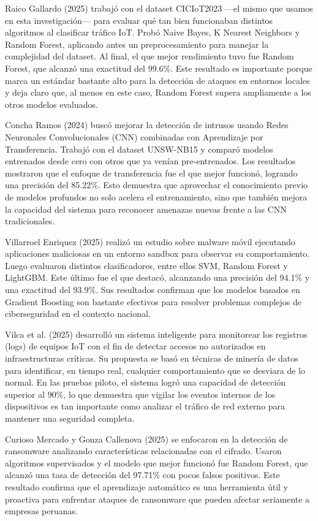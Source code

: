 Raico Gallardo (2025) trabajó con el dataset CICIoT2023 —el mismo que usamos en esta investigación— para evaluar qué tan bien funcionaban distintos algoritmos al clasificar tráfico IoT. Probó Naive Bayes, K Nearest Neighbors y Random Forest, aplicando antes un preprocesamiento para manejar la complejidad del dataset. Al final, el que mejor rendimiento tuvo fue Random Forest, que alcanzó una exactitud del 99.6\%. Este resultado es importante porque marca un estándar bastante alto para la detección de ataques en entornos locales y deja claro que, al menos en este caso, Random Forest supera ampliamente a los otros modelos evaluados.

Concha Ramos (2024) buscó mejorar la detección de intrusos usando Redes Neuronales Convolucionales (CNN) combinadas con Aprendizaje por Transferencia. Trabajó con el dataset UNSW-NB15 y comparó modelos entrenados desde cero con otros que ya venían pre-entrenados. Los resultados mostraron que el enfoque de transferencia fue el que mejor funcionó, logrando una precisión del 85.22\%. Esto demuestra que aprovechar el conocimiento previo de modelos profundos no solo acelera el entrenamiento, sino que también mejora la capacidad del sistema para reconocer amenazas nuevas frente a las CNN tradicionales.

Villarroel Enriquez (2025) realizó un estudio sobre malware móvil ejecutando aplicaciones maliciosas en un entorno sandbox para observar su comportamiento. Luego evaluaron distintos clasificadores, entre ellos SVM, Random Forest y LightGBM. Este último fue el que destacó, alcanzando una precisión del 94.1\% y una exactitud del 93.9\%. Sus resultados confirman que los modelos basados en Gradient Boosting son bastante efectivos para resolver problemas complejos de ciberseguridad en el contexto nacional.

Vilca et al. (2025) desarrolló un sistema inteligente para monitorear los registros (logs) de equipos IoT con el fin de detectar accesos no autorizados en infraestructuras críticas. Su propuesta se basó en técnicas de minería de datos para identificar, en tiempo real, cualquier comportamiento que se desviara de lo normal. En las pruebas piloto, el sistema logró una capacidad de detección superior al 90\%, lo que demuestra que vigilar los eventos internos de los dispositivos es tan importante como analizar el tráfico de red externo para mantener una seguridad completa.

Curioso Mercado y Gonza Callenova (2025) se enfocaron en la detección de ransomware analizando características relacionadas con el cifrado. Usaron algoritmos supervisados y el modelo que mejor funcionó fue Random Forest, que alcanzó una tasa de detección del 97.71\% con pocos falsos positivos. Este resultado confirma que el aprendizaje automático es una herramienta útil y proactiva para enfrentar ataques de ransomware que pueden afectar seriamente a empresas peruanas.

